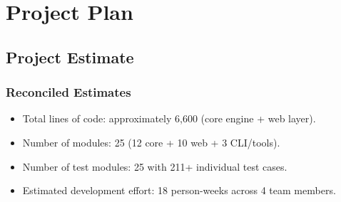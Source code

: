 \documentclass[oneside,a4paper,12pt]{book}
\begin{document}





\chapter{Project Plan}

\section{Project Estimate}

\subsection{Reconciled Estimates}
\begin{itemize}[leftmargin=2em]
    \item Total lines of code: approximately 6,600 (core engine + web layer).
    \item Number of modules: 25 (12 core + 10 web + 3 CLI/tools).
    \item Number of test modules: 25 with 211+ individual test cases.
    \item Estimated development effort: 18 person-weeks across 4 team members.
\end{itemize}
\end{document}
